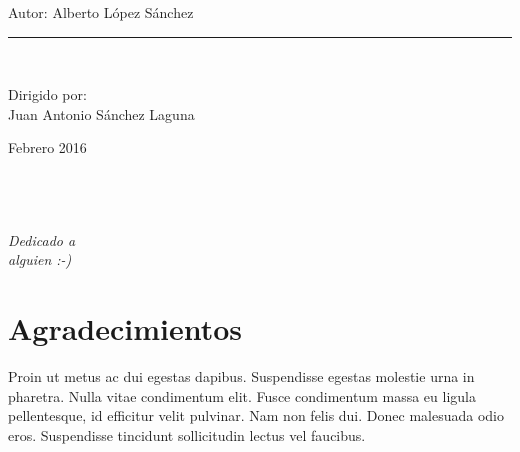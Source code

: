 \begin{titlepage}
\begin{center}
\begin{Large}
		\end{Large}
		\vspace*{0.3in}
		\begin{large}
			Autor: Alberto López Sánchez\\
		\end{large}
		\vspace*{0.2in}
		\rule{80mm}{0.1mm}\\
		\vspace*{0.2in}
		\begin{large}
			Dirigido por: \\
			Juan Antonio Sánchez Laguna\\
		\end{large}
		\vspace*{0.9in}
		Febrero 2016
	\end{center}
	\vspace*{\fill}
\end{titlepage}

\newpage
$\ $
\thispagestyle{empty}


\chapter*{}
\setcounter{page}{3}

\begin{flushright}
\textit{Dedicado a \\
alguien :-)}
\end{flushright}



\chapter*{Agradecimientos} %

Proin ut metus ac dui egestas dapibus. Suspendisse egestas molestie urna in pharetra. Nulla vitae condimentum elit. Fusce condimentum massa eu ligula pellentesque, id efficitur velit pulvinar. Nam non felis dui. Donec malesuada odio eros. Suspendisse tincidunt sollicitudin lectus vel faucibus.

